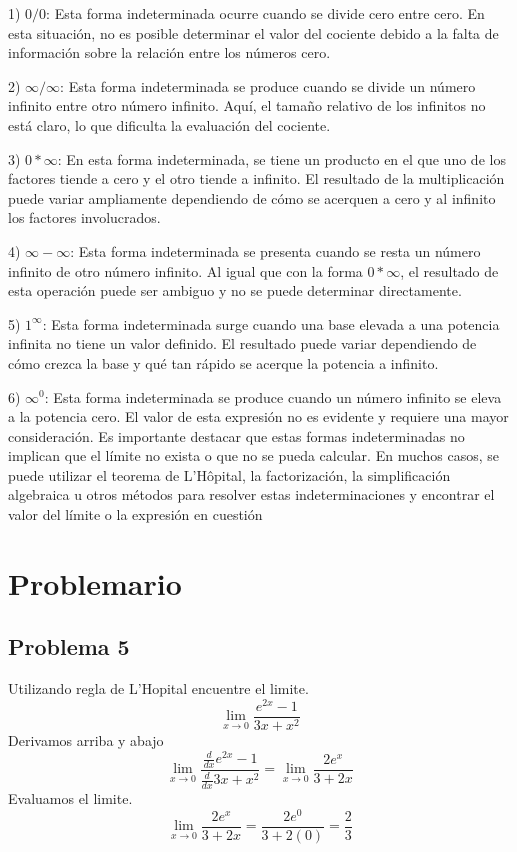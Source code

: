 \documentclass{article}
\begin{document}
    1) $0/0$: Esta forma indeterminada ocurre cuando se divide cero entre cero. En esta situación, no es posible determinar el valor del cociente debido a la falta de información sobre la relación entre los números cero.

    2) $\infty /\infty$: Esta forma indeterminada se produce cuando se divide un número infinito entre otro número infinito. Aquí, el tamaño relativo de los infinitos no está claro, lo que dificulta la evaluación del cociente.

    3) $0 * \infty$: En esta forma indeterminada, se tiene un producto en el que uno de los factores tiende a cero y el otro tiende a infinito. El resultado de la multiplicación puede variar ampliamente dependiendo de cómo se acerquen a cero y al infinito los factores involucrados.

    4) $\infty - \infty$: Esta forma indeterminada se presenta cuando se resta un número infinito de otro número infinito. Al igual que con la forma $0 * \infty $, el resultado de esta operación puede ser ambiguo y no se puede determinar directamente.

    5) $1^\infty$: Esta forma indeterminada surge cuando una base elevada a una potencia infinita no tiene un valor definido. El resultado puede variar dependiendo de cómo crezca la base y qué tan rápido se acerque la potencia a infinito.

    6) $\infty^0$: Esta forma indeterminada se produce cuando un número infinito se eleva a la potencia cero. El valor de esta expresión no es evidente y requiere una mayor consideración.
\newline
\newline
Es importante destacar que estas formas indeterminadas no implican que el límite no exista o que no se pueda calcular. En muchos casos, se puede utilizar el teorema de L'Hôpital, la factorización, la simplificación algebraica u otros métodos para resolver estas indeterminaciones y encontrar el valor del límite o la expresión en cuestión
\section{Problemario}
\subsection{Problema 5}
Utilizando regla de L'Hopital encuentre el limite.
\begin{equation}
    \lim_{x\to 0} \frac{e^{2x}-1}{3x+x^2}
\end{equation}
Derivamos arriba y abajo
\begin{equation}
    \lim_{x\to 0}\frac{\frac{d}{dx}e^{2x}-1}{\frac{d}{dx}3x+x^2} = \lim_{x\to 0}\frac{2e^x}{3+2x}
\end{equation}
Evaluamos el limite.
\begin{equation}
    \lim_{x\to 0}\frac{2e^x}{3+2x} = \frac{2e^0}{3+2(0)}= \frac{2}{3}
\end{equation}
\end{document}
